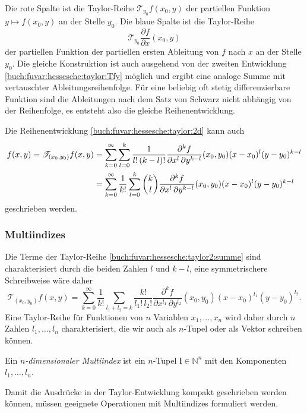 Die rote Spalte ist die Taylor-Reihe $\mathscr{T}_{y_0} f(x_0,y)$ der
partiellen Funktion $y\mapsto f(x_0,y)$ an der Stelle $y_0$.
Die blaue Spalte ist die Taylor-Reihe
\[
\mathscr{T}_{y_0} \frac{\partial f}{\partial x}(x_0,y)
\]
der partiellen Funktion der partiellen ersten Ableitung von $f$ nach $x$
an der Stelle $y_0$.
Die gleiche Konstruktion ist auch ausgehend von der zweiten Entwicklung
\eqref{buch:fuvar:hessesche:taylor:Tfy} möglich und ergibt eine
analoge Summe mit vertauschter Ableitungsreihenfolge.
Für eine beliebig oft stetig differenzierbare Funktion sind die
Ableitungen nach dem Satz von Schwarz nicht abhängig von der Reihenfolge,
es entsteht also die gleiche Reihenentwicklung.

Die Reihenentwicklung \eqref{buch:fuvar:hessesche:taylor:2d} kann auch
\begin{align}
f(x,y)
=
\mathscr{T}_{(x_0,y_0)}f(x,y)
&=
\sum_{k=0}^\infty
\sum_{l=0}^k
\frac{1}{l!\,(k-l)!}
\frac{\partial^k f}{\partial x^l\,\partial y^{k-l}}(x_0,y_0)
(x-x_0)^l(y-y_0)^{k-l}
\notag
\\
&=
\sum_{k=0}^\infty
\frac{1}{k!}
\sum_{l=0}^k
\binom{k}{l}
\frac{\partial^k f}{\partial x^l\,\partial y^{k-l}}(x_0,y_0)
(x-x_0)^l(y-y_0)^{k-l}
\label{buch:fuvar:hessesche:taylor2:summe}
\end{align}
geschrieben werden.

%
%
%
\subsubsection{Multiindizes}
Die Terme der Taylor-Reihe \eqref{buch:fuvar:hessesche:taylor2:summe}
sind charakterisiert durch die beiden Zahlen $l$ und $k-l$, eine symmetrischere
Schreibweise wäre daher
\[
\mathscr{T}_{(x_0,y_0)}f(x,y)
=
\sum_{k=0}^\infty
\frac{1}{k!}
\sum_{l_1+l_2=k}
\frac{k!}{l_1!\,l_2!}
\frac{\partial^k f}{\partial x^{l_1}\,\partial y^{l_2}}(x_0,y_0)
(x-x_0)^{l_1}(y-y_0)^{l_2}.
\]
Eine Taylor-Reihe für Funktionen von $n$ Variablen $x_1,\dots,x_n$ wird
daher durch $n$ Zahlen $l_1,\dots,l_n$ charakterisiert, die wir auch
als $n$-Tupel oder als Vektor schreiben können.

\begin{definition}[Multiindex]
Ein {\em $n$-dimensionaler Multiindex} ist ein $n$-Tupel
%
$\mathbf{l}\in\mathbb{N}^n$ mit den Komponenten $l_1,\dots,l_n$.
\end{definition}

Damit die Ausdrücke in der Taylor-Entwicklung kompakt geschrieben werden 
können, müssen geeignete Operationen mit Multiindizes formuliert werden.

